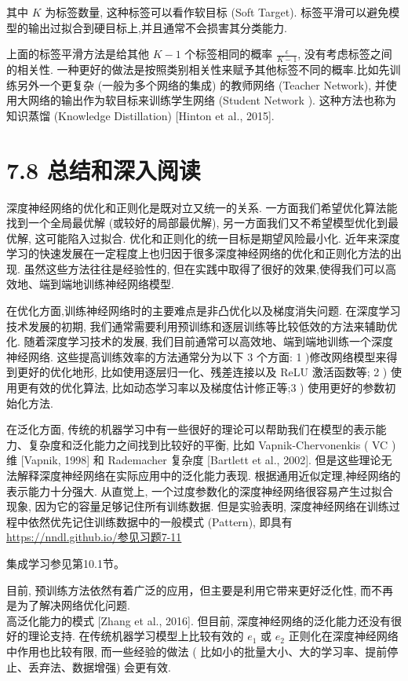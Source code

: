 \documentclass[10pt]{article}
\begin{document}
其中 $K$ 为标签数量, 这种标签可以看作软目标 (Soft Target). 标签平滑可以避免模型的输出过拟合到硬目标上,并且通常不会损害其分类能力.

上面的标签平滑方法是给其他 $K-1$ 个标签相同的概率 $\frac{\epsilon}{K-1}$, 没有考虑标签之间的相关性. 一种更好的做法是按照类别相关性来赋予其他标签不同的概率.比如先训练另外一个更复杂 (一般为多个网络的集成) 的教师网络 (Teacher Network), 并使用大网络的输出作为软目标来训练学生网络 (Student Network ). 这种方法也称为知识蒸馏 (Knowledge Distillation) [Hinton et al., 2015].

\section*{7.8 总结和深入阅读}
深度神经网络的优化和正则化是既对立又统一的关系. 一方面我们希望优化算法能找到一个全局最优解 (或较好的局部最优解), 另一方面我们又不希望模型优化到最优解, 这可能陷入过拟合. 优化和正则化的统一目标是期望风险最小化. 近年来深度学习的快速发展在一定程度上也归因于很多深度神经网络的优化和正则化方法的出现. 虽然这些方法往往是经验性的, 但在实践中取得了很好的效果,使得我们可以高效地、端到端地训练神经网络模型.

在优化方面,训练神经网络时的主要难点是非凸优化以及梯度消失问题. 在深度学习技术发展的初期, 我们通常需要利用预训练和逐层训练等比较低效的方法来辅助优化. 随着深度学习技术的发展, 我们目前通常可以高效地、端到端地训练一个深度神经网络. 这些提高训练效率的方法通常分为以下 3 个方面: 1 )修改网络模型来得到更好的优化地形, 比如使用逐层归一化、残差连接以及 ReLU 激活函数等; 2 ) 使用更有效的优化算法, 比如动态学习率以及梯度估计修正等;3 ) 使用更好的参数初始化方法.

在泛化方面, 传统的机器学习中有一些很好的理论可以帮助我们在模型的表示能力、复杂度和泛化能力之间找到比较好的平衡, 比如 Vapnik-Chervonenkis ( VC ) 维 [Vapnik, 1998] 和 Rademacher 复杂度 [Bartlett et al., 2002]. 但是这些理论无法解释深度神经网络在实际应用中的泛化能力表现. 根据通用近似定理,神经网络的表示能力十分强大. 从直觉上, 一个过度参数化的深度神经网络很容易产生过拟合现象, 因为它的容量足够记住所有训练数据. 但是实验表明, 深度神经网络在训练过程中依然优先记住训练数据中的一般模式 (Pattern), 即具有 \href{https://nndl.github.io/%E5%8F%82%E8%A7%81%E4%B9%A0%E9%A2%987-11}{https://nndl.github.io/参见习题7-11}

集成学习参见第10.1节。

目前, 预训练方法依然有着广泛的应用，但主要是利用它带来更好泛化性, 而不再是为了解决网络优化问题.\\
高泛化能力的模式 [Zhang et al., 2016]. 但目前, 深度神经网络的泛化能力还没有很好的理论支持. 在传统机器学习模型上比较有效的 $e_{1}$ 或 $e_{2}$ 正则化在深度神经网络中作用也比较有限, 而一些经验的做法 ( 比如小的批量大小、大的学习率、提前停止、丢弃法、数据增强) 会更有效.
\end{document}
